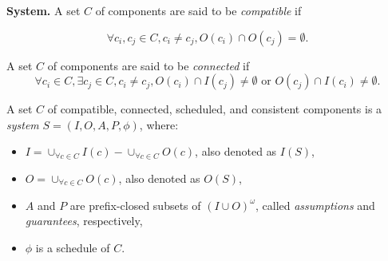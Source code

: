 {\bf System.}
A set $C$ of components are said to be \emph{compatible} if 

\begin{equation*}
\forall c_i,c_j \in C, c_i\neq c_j, O(c_i) \cap O(c_j) = \emptyset.
\end{equation*}

A set $C$ of components are said to be \emph{connected} if
\begin{equation*}
\forall c_i \in C, \exists c_j \in C, c_i\neq c_j, O(c_i) \cap I(c_j) \neq \emptyset \text{ or } O(c_j) \cap I(c_i) \neq \emptyset.
\end{equation*}

A set $C$ of compatible, connected, scheduled, and consistent components is a \emph{system} $S = (I, O, A, P, \phi)$, where:
\begin{itemize}
	\item $I = \cup_{\forall c \in C}I(c) -  \cup_{\forall c \in C}O(c)$, also denoted as $I(S)$,
	\item $O = \cup_{\forall c \in C}O(c)$, also denoted as $O(S)$,
	\item $A$ and $P$ are prefix-closed subsets of $(I \cup O)^\omega$, called \emph{assumptions} and \emph{guarantees}, respectively,
	\item $\phi$ is a schedule of $C$.	
\end{itemize}